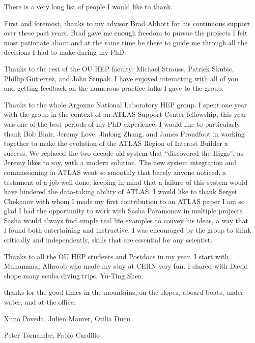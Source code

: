 
There is a very long list of people I would like to thank.

First and foremost, thanks to my advisor Brad Abbott for his continuous support over these past years. 
Brad gave me enough freedom to pursue the projects I felt most pationate about and at the same time be 
there to guide me through all the decisions I had to make during my PhD.

Thanks to the rest of the OU HEP faculty: Michael Strauss, Patrick Skubic, Phillip Gutierrez, and John Stupak. I have enjoyed 
interacting with all of you and getting feedback on the numerous practice talks I gave to the group.

Thanks to the whole Argonne National Laboratory HEP group. I spent one year with the group in the context of an ATLAS Support Center 
fellowship, this year was one of the best periods of my PhD experience. I would like to particularly thank Bob Blair, Jeremy Love, 
Jinlong Zhang, and James Proudfoot in working together to make the evolution of the ATLAS Region of Interest Builder a success. 
We replaced the two-decade-old system that ``discovered the Higgs'', as Jeremy likes to say, with a modern solution.
The new system integration and commissioning in ATLAS went so smoothly that barely anyone noticed, a testament of a job well done,
keeping in mind that a failure of this system would have hindered the data-taking ability of ATLAS.
I would like to thank Sergei Chekanov with whom I made my first contribution to an ATLAS paper
I am so glad I had the opportunity to work with Sasha Paramonov in multiple projects. 
Sasha would always find simple real life examples to convey his ideas, a way that I found both entertaining and instructive. 
I was encouraged by the group to think critically and independently, skills that are essential for any scientist.

Thanks to all the OU HEP students and Postdocs in my year. 
I start with Muhammad Alhroob who made my stay at CERN very fun. 
I shared with David shope many scuba diving trips. Yu-Ting Shen.

thanks for the good times in the mountains, on the slopes, aboard boats, under water, and at the office.


Ximo Poveda, Julien Maurer, Otilia Ducu

Peter Tornambe, Fabio Cardillo

